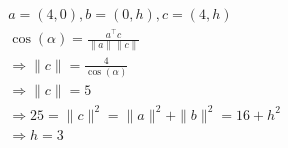 {\color{solution}
\begin{align*}
&a = (4,0), b = (0, h), c = (4, h)\\
&\cos(\alpha) = \frac{a^\top c}{\|a \| \| c\|}\\
&\Rightarrow \| c\| = \frac{4}{\cos(\alpha)}\\
&\Rightarrow  \| c\| = 5\\
&\Rightarrow 25 = \| c \|^2 = \|a\|^2 + \| b\|^2 = 16 + h^2\\
&\Rightarrow h = 3
\end{align*}
}